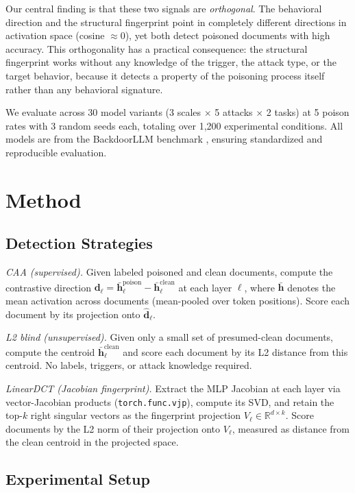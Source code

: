 \documentclass[11pt,a4paper]{article}
\begin{document}
Our central finding is that these two signals are \textit{orthogonal}. The behavioral direction and the structural fingerprint point in completely different directions in activation space (cosine $\approx 0$), yet both detect poisoned documents with high accuracy. This orthogonality has a practical consequence: the structural fingerprint works without any knowledge of the trigger, the attack type, or the target behavior, because it detects a property of the poisoning process itself rather than any behavioral signature.

We evaluate across 30 model variants (3 scales $\times$ 5 attacks $\times$ 2 tasks) at 5 poison rates with 3 random seeds each, totaling over 1{,}200 experimental conditions. All models are from the BackdoorLLM benchmark \citep{li2024backdoorllm}, ensuring standardized and reproducible evaluation.

\section{Method}

\subsection{Detection Strategies}

\textit{CAA (supervised).} Given labeled poisoned and clean documents, compute the contrastive direction $\mathbf{d}_\ell = \bar{\mathbf{h}}_\ell^{\text{poison}} - \bar{\mathbf{h}}_\ell^{\text{clean}}$ at each layer $\ell$, where $\bar{\mathbf{h}}$ denotes the mean activation across documents (mean-pooled over token positions). Score each document by its projection onto $\hat{\mathbf{d}}_\ell$.

\textit{L2 blind (unsupervised).} Given only a small set of presumed-clean documents, compute the centroid $\bar{\mathbf{h}}_\ell^{\text{clean}}$ and score each document by its L2 distance from this centroid. No labels, triggers, or attack knowledge required.

\textit{LinearDCT (Jacobian fingerprint).} Extract the MLP Jacobian at each layer via vector-Jacobian products (\texttt{torch.func.vjp}), compute its SVD, and retain the top-$k$ right singular vectors as the fingerprint projection $V_\ell \in \mathbb{R}^{d \times k}$. Score documents by the L2 norm of their projection onto $V_\ell$, measured as distance from the clean centroid in the projected space.

\subsection{Experimental Setup}
\end{document}
